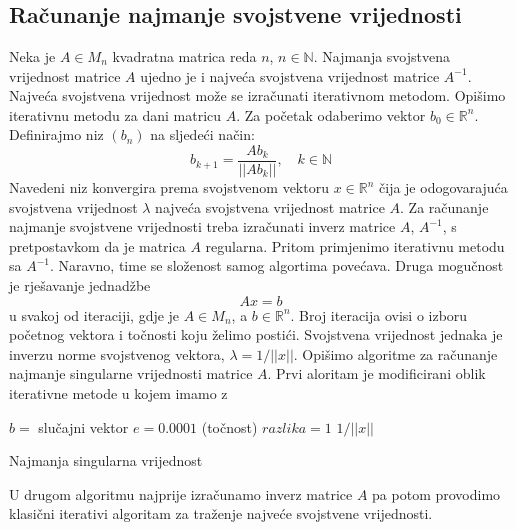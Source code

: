 \documentclass[a4paper,twoside,12pt]{memoir} %
\begin{document}
\chapter{}

\section{Računanje najmanje svojstvene vrijednosti}

Neka je $A \in M_n$ kvadratna matrica reda $n$, $n\in \mathbb{N}$. Najmanja svojstvena vrijednost matrice $A$ ujedno je i najveća svojstvena vrijednost matrice $A^{-1}$. Najveća svojstvena vrijednost može se izračunati iterativnom metodom. Opišimo iterativnu metodu za dani matricu $A$. Za početak odaberimo vektor $b_0 \in \mathbb{R}^{n}$. Definirajmo niz $(b_n)$ na sljedeći način: $$b_{k+1}=\frac{Ab_k}{||Ab_k||},\quad k \in \mathbb{N}$$ Navedeni niz konvergira prema svojstvenom vektoru $x \in \mathbb{R}^n$ čija je odogovarajuća svojstvena vrijednost $\lambda$ najveća svojstvena vrijednost matrice $A$.
Za računanje najmanje svojstvene vrijednosti treba izračunati inverz matrice $A$,  $A^{-1}$, s pretpostavkom da je matrica $A$ regularna. Pritom primjenimo iterativnu metodu sa $A^{-1}$. Naravno, time se složenost samog algortima povećava. Druga mogučnost je rješavanje jednadžbe
\begin{equation}
\label{eq:Ax=b}
	Ax=b
\end{equation}
 u svakoj od iteraciji, gdje je $A \in M_n$, a $b \in \mathbb{R}^n$. Broj iteracija ovisi o izboru početnog vektora i točnosti koju želimo postići. Svojstvena vrijednost jednaka je inverzu norme svojstvenog vektora, $\lambda=1/||x||$. Opišimo algoritme za računanje najmanje singularne vrijednosti matrice $A$.\newpage
Prvi aloritam je modificirani oblik iterativne metode u kojem imamo z \\

\begin{algorithm}[H]
\SetAlgoLined
{}
 	$b=$ slučajni vektor \;
 	$e = 0.0001$ (točnost)\;
 	$razlika = 1$\;
 	\Return $1/||x||$
 \caption{Najmanja singularna vrijednost }
\end{algorithm}

U drugom algoritmu najprije izračunamo inverz matrice $A$ pa potom provodimo klasični iterativi algoritam za traženje najveće svojstvene vrijednosti.\\
\end{document}
